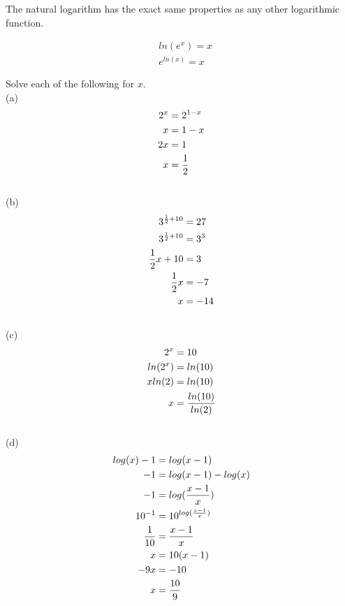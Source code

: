The natural logarithm has the exact same properties as any other logarithmic function. \\

\begin{theorem}
	\begin{align}
		 & ln(e^x) = x   \\
		 & e^{ln(x)} = x
	\end{align}
\end{theorem}

\begin{exercise}\nonumber
	Solve each of the following for $ x $. \\

	(a) \\
	\begin{align}
		2^x & = 2^{1-x}     \\
		x   & = 1 - x       \\
		2x  & = 1           \\
		x   & = {1 \over 2}
	\end{align}
	\\

	(b) \\
	\begin{align}
		3^{{1 \over 2} + 10} & = 27   \\
		3^{{1 \over 2} + 10} & = 3^3  \\
		{1 \over 2}x + 10    & = 3    \\
		{1 \over 2}x         & = -7   \\
		x                    & = - 14
	\end{align}
	\\

	(c) \\
	\begin{align}
		2^x     & = 10                   \\
		ln(2^x) & = ln(10)               \\
		xln(2)  & = ln(10)               \\
		x       & = {ln(10) \over ln(2)}
	\end{align}
	\\

	(d) \\
	\begin{align}
		log(x) - 1   & = log(x - 1)                \\
		-1           & = log(x - 1) - log(x)       \\
		-1           & = log({x - 1 \over x})      \\
		10^{-1}      & = 10^{log({x - 1 \over x})} \\
		{1 \over 10} & = {x - 1 \over x}           \\
		x            & = 10(x - 1)                 \\
		-9x          & = -10                       \\
		x            & = {10 \over 9}
	\end{align}
	\\


\end{exercise}
